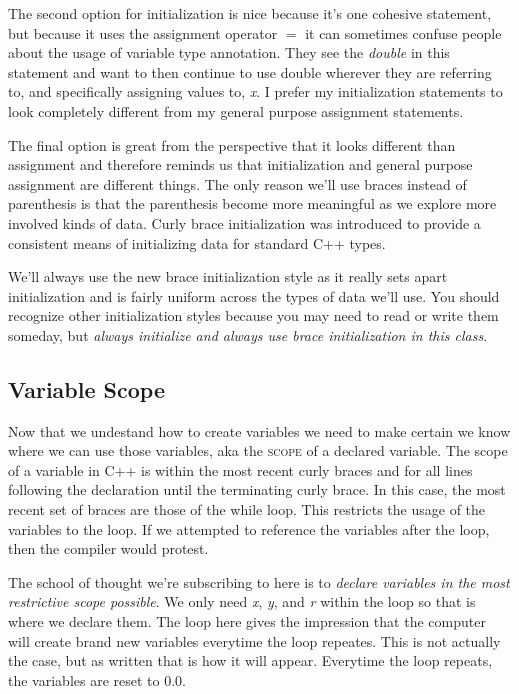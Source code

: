 \documentclass[]{tufte-handout}
\begin{document}
The second option for initialization is nice because it's one cohesive statement, but because it uses the assignment operator $=$ it can sometimes confuse people about the usage of variable type annotation. They see the \textit{double} in this statement and want to then continue to use double wherever they are referring to, and specifically assigning values to, \textit{x}.  I prefer my initialization statements to look completely different from my general purpose assignment statements.

The final option is great from the perspective that it looks different than assignment and therefore reminds us that initialization and general purpose assignment are different things. The only reason we'll use braces instead of parenthesis is that the parenthesis become more meaningful as we explore more involved kinds of data.  Curly brace initialization was introduced to provide a consistent means of initializing data for standard C++ types.

We'll always use the new brace initialization style as it really sets apart initialization and is fairly uniform across the types of data we'll use. You should recognize other initialization styles because you may need to read or write them someday, but \textit{always initialize and always use brace initialization in this class}.

\subsection{Variable Scope}

Now that we undestand how to create variables we need to make certain we know where we can use those variables, aka the \textsc{scope} of a declared variable. The scope of a variable in C++ is within the most recent curly braces and for all lines following the declaration until the terminating curly brace. In this case, the most recent set of braces are those of the while loop. This restricts the usage of the variables to the loop. If we attempted to reference the variables after the loop, then the compiler would protest.

The school of thought we're subscribing to here is to \textit{declare variables in the most restrictive scope possible}. We only need \textit{x}, \textit{y}, and \textit{r} within the loop so that is where we declare them. The loop here gives the impression that the computer will create brand new variables everytime the loop repeates. This is not actually the case, but as written that is how it will appear. Everytime the loop repeats, the variables are reset to $0.0$.
\end{document}
